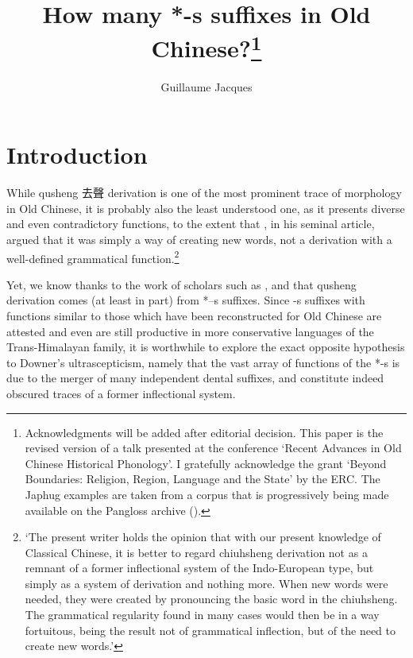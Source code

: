 \documentclass[oldfontcommands,oneside,a4paper,11pt]{article}
\newcommand{\ipa}[1]{{\phon \mbox{#1}}} %
\newcommand{\zh}[1]{{\cn #1}}
\begin{document}
 
\title{How many *-s suffixes in Old Chinese?\footnote{Acknowledgments will be added after editorial decision. This paper is the revised version of a talk presented at the conference `Recent Advances in Old Chinese Historical Phonology'. I gratefully acknowledge the grant `Beyond Boundaries: Religion, Region, Language and the State' by the ERC. The Japhug examples are taken from a corpus that is progressively being made available on the Pangloss archive (\citealt{michailovsky14pangloss}).} } %
\author{Guillaume Jacques}
\maketitle
 
\section{Introduction}
While qusheng \zh{去聲} derivation is one of the most prominent trace of morphology in Old Chinese, it is probably also the least understood one, as it presents diverse and even contradictory functions, to the extent that \citet[262]{downer59}, in his seminal article, argued that it was simply a way of creating new words, not a derivation with a well-defined grammatical function.\footnote{`The present writer holds the opinion that with our present knowledge of Classical Chinese, it is better to regard chiuhsheng derivation not as a remnant of a former inflectional system of the Indo-European type, but simply as a system of derivation and nothing more. When new words were needed, they were created by pronouncing the basic word in the chiuhsheng. The grammatical regularity found in many cases would then be in a way fortuitous, being the result not of grammatical inflection, but of the need to create new words.'}
 
Yet, we know thanks to the work of scholars such as \citet{haudricourt54chinois}, \citet{forrest60occlusives, schuessler85qusheng} and \citet{sagart99roc} that qusheng derivation comes (at least in part) from *\ipa{--s} suffixes. Since \ipa{-s} suffixes with functions similar to those which have been reconstructed for Old Chinese are attested and even are still productive in more conservative languages of the Trans-Himalayan family, it is worthwhile to explore the exact opposite hypothesis to Downer's ultrascepticism, namely that the vast array of functions of the *-s is due to the merger of many independent dental suffixes, and constitute indeed obscured traces of a former inflectional system.
\end{document}
